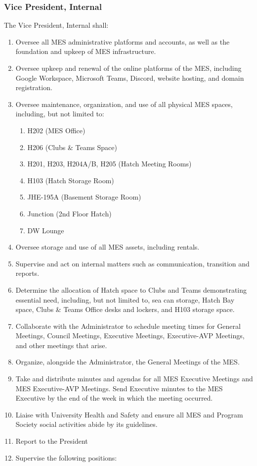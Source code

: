 \subsubsection{Vice President,
 Internal}
\label{vice-president-internal}
The Vice President, Internal shall:

\begin{enumerate}
 \item
  Oversee all MES administrative platforms and accounts, as well as the foundation and upkeep of MES infrastructure.
 \item
  Oversee upkeep and renewal of the online platforms of the MES, including Google Workspace, Microsoft Teams, Discord, website hosting, and domain registration.
 \item
  Oversee maintenance, organization, and use of all physical MES spaces, including, but not limited to:

  \begin{enumerate}
   \item
    H202 (MES Office)
   \item
    H206 (Clubs \& Teams Space)
   \item
    H201, H203, H204A/B, H205 (Hatch Meeting Rooms)
   \item
    H103 (Hatch Storage Room)
   \item
    JHE-195A (Basement Storage Room)
   \item
    Junction (2nd Floor Hatch)
   \item
    DW Lounge
  \end{enumerate}
 \item
  Oversee storage and use of all MES assets, including rentals.
 \item
  Supervise and act on internal matters such as communication, transition and reports.
 \item
  Determine the allocation of Hatch space to Clubs and Teams demonstrating essential need, including, but not limited to, sea can storage, Hatch Bay space, Clubs \& Teams Office desks and lockers, and H103 storage space.
 \item
  Collaborate with the Administrator to schedule meeting times for General Meetings, Council Meetings, Executive Meetings, Executive-AVP Meetings, and other meetings that arise.
 \item
  Organize, alongside the Administrator, the General Meetings of the MES.
 \item
  Take and distribute minutes and agendas for all MES Executive Meetings and MES Executive-AVP Meetings. Send Executive minutes to the MES Executive by the end of the week in which the meeting occurred.
 \item
  Liaise with University Health and Safety and ensure all MES and Program Society social activities abide by its guidelines.
 \item
  Report to the President
 \item
  Supervise the following positions:


\end{enumerate}
